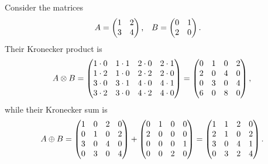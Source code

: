 \begin{example}
  Consider the matrices
  \begin{align}
    A &= \begin{pmatrix}
      1 & 2 \\
      3 & 4
    \end{pmatrix} \text,
    & B &= \begin{pmatrix}
      0 & 1 \\
      2 & 0
    \end{pmatrix} \text.
  \end{align}
  Their Kronecker product is
  \begin{equation}
    A \otimes B = \begin{pmatrix}
      1 \cdot 0 & 1 \cdot 1 & 2 \cdot 0 & 2 \cdot 1 \\
      1 \cdot 2 & 1 \cdot 0 & 2 \cdot 2 & 2 \cdot 0 \\
      3 \cdot 0 & 3 \cdot 1 & 4 \cdot 0 & 4 \cdot 1 \\
      3 \cdot 2 & 3 \cdot 0 & 4 \cdot 2 & 4 \cdot 0
    \end{pmatrix} = \begin{pmatrix}
      0 & 1 & 0 & 2 \\
      2 & 0 & 4 & 0 \\
      0 & 3 & 0 & 4 \\
      6 & 0 & 8 & 0
    \end{pmatrix}\text,
  \end{equation}
  while their Kronecker sum is
  \begin{equation}
    A \oplus B = \begin{pmatrix}
      1 & 0 & 2 & 0 \\
      0 & 1 & 0 & 2 \\
      3 & 0 & 4 & 0 \\
      0 & 3 & 0 & 4
    \end{pmatrix} + \begin{pmatrix}
      0 & 1 & 0 & 0 \\
      2 & 0 & 0 & 0 \\
      0 & 0 & 0 & 1 \\
      0 & 0 & 2 & 0
    \end{pmatrix} = \begin{pmatrix}
      1 & 1 & 2 & 0 \\
      2 & 1 & 0 & 2 \\
      3 & 0 & 4 & 1 \\
      0 & 3 & 2 & 4
    \end{pmatrix}\text.
  \end{equation}
\end{example}

